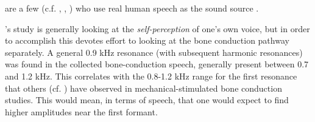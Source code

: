 \DIFdelbegin %
\DIFdelend %

\DIFdelbegin {}\DIFdelend \DIFaddbegin {}\DIFaddend are a few \DIFdelbegin {}\DIFdelend (c.f. \cite{bekesy:48}, \cite{porschmann:00}, \cite{reinfeldt:10}) who use real human speech as the sound source\DIFaddbegin {}\textit{} \DIFaddend .
%

\cite{porschmann:00}'s study is generally looking at the \textit{self-perception} of one's own voice, but in order to accomplish this devotes effort to looking at the bone conduction pathway separately.  A general 0.9 kHz resonance (with subsequent harmonic resonances) was found in the collected bone-conduction speech, \DIFdelbegin {}\DIFdelend generally present between 0.7 and 1.2 kHz.  This correlates with the 0.8-1.2 kHz range for the first resonance that others (cf. \cite{hakansson:94}) have observed in mechanical-stimulated bone conduction studies. This would mean, in terms of speech, that one would expect to find higher \DIFaddbegin {}\DIFaddend amplitudes near the first formant.

